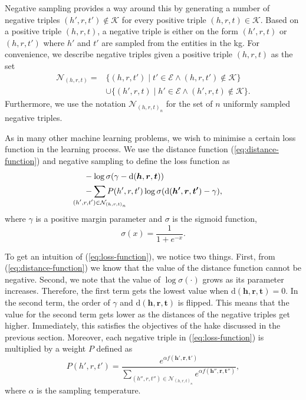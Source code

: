 Negative sampling provides a way around this by generating a number of negative triples $(h', r, t') \not\in \mathcal{K}$ for every positive triple $(h, r, t) \in \mathcal{K}$.
Based on a positive triple $(h, r, t)$, a negative triple is either on the form $(h', r, t)$ or $(h, r, t')$ where $h'$ and $t'$ are sampled from the entities in the \ac{kg}.
For convenience, we describe negative triples given a positive triple $(h, r, t)$ as the set
\begin{equation}\label{eq:negative-samples}
  \begin{split}
    \mathcal{N}_{(h, r, t)} = {} & \{(h, r, t') \mid t' \in \mathcal{E} \wedge (h, r, t') \not\in \mathcal{K}\} \\
    & \cup \{(h', r, t) \mid h' \in \mathcal{E} \wedge (h', r, t) \not\in \mathcal{K}\}.
  \end{split}
\end{equation}
Furthermore, we use the notation $\mathcal{N}_{{(h, r, t)}_n}$ for the set of $n$ uniformly sampled negative triples.

As in many other machine learning problems, we wish to minimise a certain loss function in the learning process.
We use the distance function (\ref{eq:distance-function}) and negative sampling to define the loss function as
\begin{equation}\label{eq:loss-function}
  \begin{split}
    & - \log\sigma(\gamma - \text{d}(\bm{h}, \bm{r}, \bm{t})) \\
    &- \sum_{\mathclap{(h', r, t') \in \mathcal{N}_{{(h, r, t)}_n}}} P(h', r, t')\log\sigma(\text{d}(\bm{h'}, \bm{r}, \bm{t'}) - \gamma),
  \end{split}
\end{equation}
where $\gamma$ is a positive margin parameter and $\sigma$ is the sigmoid function,
\[\sigma(x) = \frac{1}{1 + e^{-x}}.\]

To get an intuition of (\ref{eq:loss-function}), we notice two things.
First, from (\ref{eq:distance-function}) we know that the value of the distance function cannot be negative.
Second, we note that the value of $\log\sigma(\cdot)$ grows as its parameter increases.
Therefore, the first term gets the lowest value when $\text{d}(\bm{h}, \bm{r}, \bm{t}) = 0$.
In the second term, the order of $\gamma$ and $\text{d}(\bm{h}, \bm{r}, \bm{t})$ is flipped.
This means that the value for the second term gets lower as the distances of the negative triples get higher.
Immediately, this satisfies the objectives of the \ac{hake} discussed in the previous section.
Moreover, each negative triple in (\ref{eq:loss-function}) is multiplied by a weight $P$ defined as
\[P(h', r, t') = \frac{e^{\alpha f(\bm{h'}, \bm{r}, \bm{t'})}}{\sum_{(h'', r, t'') \in \mathcal{N}_{{(h, r, t)}_n}} e^{\alpha f(\bm{h''}, \bm{r}, \bm{t''})}},\]
where $\alpha$ is the sampling temperature.


